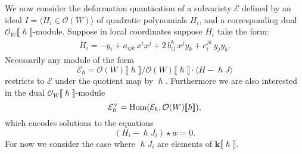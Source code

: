    We now consider the deformation quantisation of a subvariety \( \mathcal{E}\) defined by an ideal \(I=  \langle H_i \in \mathcal{O}(W)\rangle \) of quadratic polynomials \( H_i\), and a corresponding dual \(\mathcal{O}_W \lBrack \hslash \rBrack\)-module.  Suppose in local coordinates suppose \(H_i \) take the form:
    \begin{align*}
            H_i =  -y_i + a_{ijk}\, x^i  x^j +   2  \,  b_{ij}^k  \, x^j y_k +  c_{i}^{jk} \, y_j  y_k.
    \end{align*}
    Necessarily any module of the form 
    \[ \mathcal{E}_{\hslash} = \mathcal{O}(W) \lBrack \hslash \rBrack /  \mathcal{O}(W) \lBrack \hslash \rBrack \cdot \langle H - \hslash J\rangle \]
    restricts to \( \mathcal{E}\) under the quotient map by \(\hslash\). Furthermore we are also interested in the dual \(\mathcal{O}_W \lBrack \hslash \rBrack\)-module 
    \[ \mathcal{E}_{\hslash}^{\vee} = \mathrm{Hom}( \mathcal{E}_{\hslash}, \mathcal{O}(W)[\![\hslash]\!]) ,\]
    which encodes solutions to the equations 
    \[( H_i - \hslash J_i) \star w = 0.\]
    For now we consider the case where \( \hslash J_i \) are elements of \( \mathbf{k}\lBrack \hslash \rBrack\).
    
